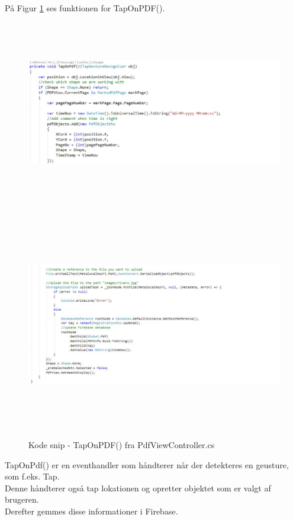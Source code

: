 På Figur \ref{fig:TapOnPDF2} ses funktionen for TapOnPDF().
\begin{figure}[H] %
	\centering
	\includegraphics[height=8cm, width=15cm]{../ArkitekturDesign/Design/RegisterPDF/TapOnPDF1}
\end{figure}
\begin{figure}[H] %
	\centering
	\includegraphics[height=10cm, width=17cm]{../ArkitekturDesign/Design/RegisterPDF/TapOnPDF2}
	\caption{Kode snip - TapOnPDF() fra PdfViewController.cs}
	\label{fig:TapOnPDF2}
\end{figure}
TapOnPdf() er en eventhandler som håndterer når der detekteres en geusture, som f.eks. Tap. \\
Denne håndterer også tap lokationen og opretter objektet som er valgt af brugeren. \\
Derefter gemmes disse informationer i Firebase.


